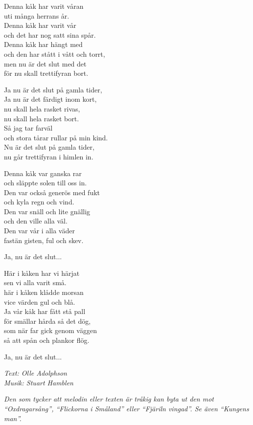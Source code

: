 \vspace{10pt}
Denna kåk har varit våran\\
uti många herrans år.\\
Denna kåk har varit vår\\
och det har nog satt sina spår.\\
Denna kåk har hängt med\\
och den har stått i vått och torrt,\\
men nu är det slut med det\\
för nu skall trettifyran bort.\par
\vspace{10pt}
Ja nu är det slut på gamla tider,\\
Ja nu är det färdigt inom kort,\\
nu skall hela rasket rivas,\\
nu skall hela rasket bort.\\
Så jag tar farväl\\
och stora tårar rullar på min kind.\\
Nu är det slut på gamla tider,\\
nu går trettifyran i himlen in.\par
\vspace{10pt}
Denna kåk var ganska rar\\
och släppte solen till oss in.\\
Den var också generös med fukt\\
och kyla  regn och vind.\\
Den var snäll och lite gnällig\\
och den ville alla väl.\\
Den var vår i alla väder\\
fastän gisten, ful och skev.\par
\vspace{10pt}
Ja, nu är det slut...\par
\vspace{10pt}
Här i kåken har vi härjat\\
sen vi alla varit små.\\
här i kåken klådde morsan\\
vice värden gul och blå.\\
Ja vår kåk har fått stå pall\\
för smällar hårda så det dög,\\
som när far gick genom väggen\\
så att spån och plankor flög.\par
\vspace{10pt}
Ja, nu är det slut...\par
\vspace{10pt}
{\footnotesize\textit{Text: Olle Adolphson\\
Musik: Stuart Hamblen}}\par
\vspace{10pt}
{\footnotesize\textit{Den som tycker att melodin eller texten är tråkig kan byta ut den mot ``Oxdragarsång'', ``Flickorna i Småland'' eller ``Fjäriln vingad''. Se även ``Kungens man''.}}
